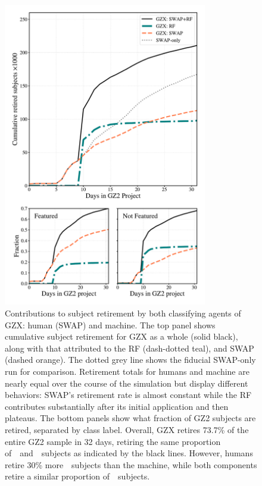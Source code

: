 \begin{figure}
\centering
\includegraphics[width=3.5in]{Figures/human_machine/GZX_component_contributions.pdf}
\caption[Individual contributions of human and machine to galaxy classification]{Contributions to subject retirement by both classifying agents of GZX: human (SWAP) and machine. The top panel shows cumulative subject retirement for GZX as a whole (solid black), along with that attributed to the RF (dash-dotted teal), and SWAP (dashed orange). The dotted grey line shows the fiducial SWAP-only run for comparison. Retirement totals for humans and machine are nearly equal over the course of the simulation but display different behaviors: SWAP's retirement rate is almost constant while the RF contributes substantially after its initial application and then plateaus.  The bottom panels show what fraction of GZ2 subjects are retired, separated by class label. Overall, GZX retires 73.7\% of the entire GZ2 sample in 32 days, retiring the same proportion of~\feat~and~\notfeat~subjects as indicated by the black lines. However, humans retire 30\% more~\feat~subjects than the machine, while both components retire a similar proportion of~\notfeat~subjects. \label{fig: gzx components}}
\end{figure}

